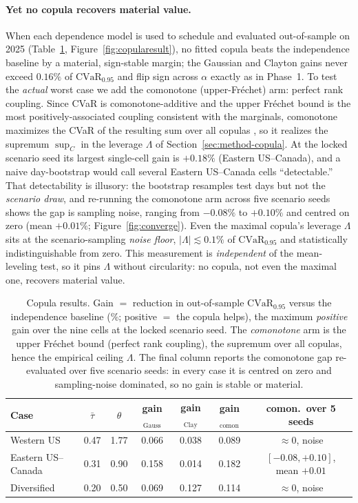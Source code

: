 \documentclass[12pt]{article}
\newcommand{\CVaR}{\mathrm{CVaR}}
\begin{document}
\paragraph{Yet no copula recovers material value.} When each dependence model is used
to schedule and evaluated out-of-sample on 2025 (Table~\ref{tab:copula},
Figure~\ref{fig:copularesult}), no fitted copula beats the independence baseline by a
material, sign-stable margin; the Gaussian and Clayton gains never exceed $0.16\%$ of
$\CVaR_{0.95}$ and flip sign across $\alpha$ exactly as in Phase~1. To test the
\emph{actual} worst case we add the comonotone (upper-Fr\'echet) arm: perfect rank
coupling. Since CVaR is comonotone-additive and the upper Fr\'echet bound is the most
positively-associated coupling consistent with the marginals, comonotone maximizes the
CVaR of the resulting sum over all copulas \citep{artzner1999,embrechts2002}, so it
realizes the supremum $\sup_C$ in the leverage $\Lambda$ of
Section~\ref{sec:method-copula}. At the locked scenario seed its largest single-cell
gain is $+0.18\%$ (Eastern US--Canada), and a naive day-bootstrap would call several
Eastern US--Canada cells ``detectable.'' That detectability is illusory: the bootstrap
resamples test days but not the \emph{scenario draw}, and re-running the comonotone arm
across five scenario seeds shows the gap is sampling noise, ranging from $-0.08\%$ to
$+0.10\%$ and centred on zero (mean $+0.01\%$; Figure~\ref{fig:converge}). Even the
maximal copula's leverage $\Lambda$ sits at the scenario-sampling \emph{noise floor},
$|\Lambda|\lesssim0.1\%$ of $\CVaR_{0.95}$ and statistically indistinguishable from
zero. This measurement is \emph{independent} of the mean-leveling test, so it pins $\Lambda$
without circularity: no copula, not even the maximal one, recovers material value.

\begin{table}[h]
\centering\small
\caption{Copula results. Gain $=$ reduction in out-of-sample $\CVaR_{0.95}$ versus the
independence baseline (\%; positive $=$ the copula helps), the maximum \emph{positive}
gain over the nine cells at the locked scenario seed. The \emph{comonotone} arm is the
upper Fr\'echet bound (perfect rank coupling), the supremum over all copulas, hence the
empirical ceiling $\Lambda$. The final column reports the comonotone gap re-evaluated
over five scenario seeds: in every case it is centred on zero and sampling-noise
dominated, so no gain is stable or material.}
\label{tab:copula}
\begin{tabular}{lcccccc}
\toprule
Case & $\bar\tau$ & $\theta$ & gain$_{\text{Gauss}}$ & gain$_{\text{Clay}}$ &
gain$_{\text{comon}}$ & comon.\ over 5 seeds\\
\midrule
Western US   & 0.47 & 1.77 & 0.066 & 0.038 & 0.089 & $\approx0$, noise\\
Eastern US--Canada      & 0.31 & 0.90 & 0.158 & 0.014 & 0.182 & $[-0.08,+0.10]$, mean $+0.01$\\
Diversified & 0.20 & 0.50 & 0.069 & 0.127 & 0.114 & $\approx0$, noise\\
\bottomrule
\end{tabular}
\end{table}
\end{document}
